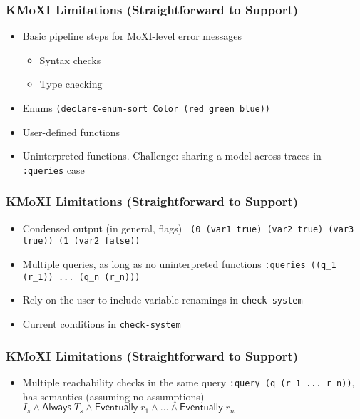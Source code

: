\documentclass[11pt,xcolor={dvipsnames},hyperref={pdftex,pdfpagemode=UseNone,hidelinks,pdfdisplaydoctitle=true},usepdftitle=false]{beamer}
\newcommand{\code}[1]{{\footnotesize\texttt{#1}}}
\begin{document}
\begin{frame}
    \frametitle{KMoXI Limitations (Straightforward to Support)}
    \pause
    \begin{itemize}
        \item Basic pipeline steps for MoXI-level error messages
        \begin{itemize}
            \item Syntax checks 
            \item Type checking
        \end{itemize} 
        \pause
        \item Enums \newline 
        {\footnotesize \texttt{(declare-enum-sort Color (red green blue))}}
        \pause
        \item User-defined functions \pause
        \item Uninterpreted functions. Challenge: sharing a model across traces in \code{:queries} case
    \end{itemize}
\end{frame}

\begin{frame}
    \frametitle{KMoXI Limitations (Straightforward to Support)}
    \begin{itemize}
        \item Condensed output (in general, flags) \newline 
        {\footnotesize \texttt {
                (0 (var1 true) (var2 true) (var3 true)) \newline
                (1 (var2 false))}} \pause 
        \item Multiple queries, as long as no uninterpreted functions \newline 
        {\footnotesize \texttt {:queries ((q\_1 (r\_1)) ... (q\_n (r\_n)))}} \pause
        \item Rely on the user to include variable renamings in \code{check-system} \pause
        \item Current conditions in \code{check-system}
    \end{itemize}
\end{frame}

\begin{frame}
    \frametitle{KMoXI Limitations (Straightforward to Support)}
    \begin{itemize}
        \item Multiple reachability checks in the same query \newline \pause
        \code{:query (q (r\_1 ... r\_n))}\pause, \newline has semantics (assuming no assumptions) \newline 
        $I_s \land \mathsf{Always}\;T_s \land \mathsf{Eventually}\; r_1 \land \dots \land \mathsf{Eventually}\; r_n$ 
    \end{itemize}
\end{frame}
 
\end{document}
